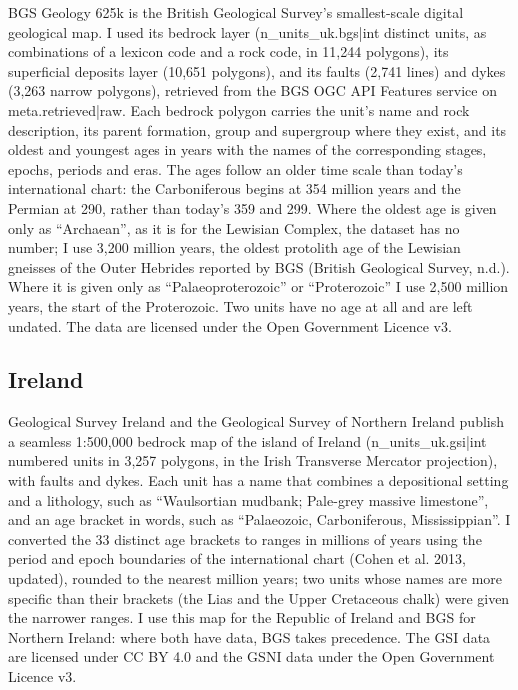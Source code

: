 \documentclass[11pt,a4paper]{article}
\begin{document}
BGS Geology 625k is the British Geological Survey's smallest-scale digital geological map. I used its bedrock layer ({{n_units_uk.bgs|int}} distinct units, as combinations of a lexicon code and a rock code, in 11,244 polygons), its superficial deposits layer (10,651 polygons), and its faults (2,741 lines) and dykes (3,263 narrow polygons), retrieved from the BGS OGC API Features service on {{meta.retrieved|raw}}. Each bedrock polygon carries the unit's name and rock description, its parent formation, group and supergroup where they exist, and its oldest and youngest ages in years with the names of the corresponding stages, epochs, periods and eras. The ages follow an older time scale than today's international chart: the Carboniferous begins at 354 million years and the Permian at 290, rather than today's 359 and 299. Where the oldest age is given only as ``Archaean'', as it is for the Lewisian Complex, the dataset has no number; I use 3,200 million years, the oldest protolith age of the Lewisian gneisses of the Outer Hebrides reported by BGS (British Geological Survey, n.d.). Where it is given only as ``Palaeoproterozoic'' or ``Proterozoic'' I use 2,500 million years, the start of the Proterozoic. Two units have no age at all and are left undated. The data are licensed under the Open Government Licence v3.

\subsection{Ireland}

Geological Survey Ireland and the Geological Survey of Northern Ireland publish a seamless 1:500,000 bedrock map of the island of Ireland ({{n_units_uk.gsi|int}} numbered units in 3,257 polygons, in the Irish Transverse Mercator projection), with faults and dykes. Each unit has a name that combines a depositional setting and a lithology, such as ``Waulsortian mudbank; Pale-grey massive limestone'', and an age bracket in words, such as ``Palaeozoic, Carboniferous, Mississippian''. I converted the 33 distinct age brackets to ranges in millions of years using the period and epoch boundaries of the international chart (Cohen et al. 2013, updated), rounded to the nearest million years; two units whose names are more specific than their brackets (the Lias and the Upper Cretaceous chalk) were given the narrower ranges. I use this map for the Republic of Ireland and BGS for Northern Ireland: where both have data, BGS takes precedence. The GSI data are licensed under CC BY 4.0 and the GSNI data under the Open Government Licence v3.
\end{document}
